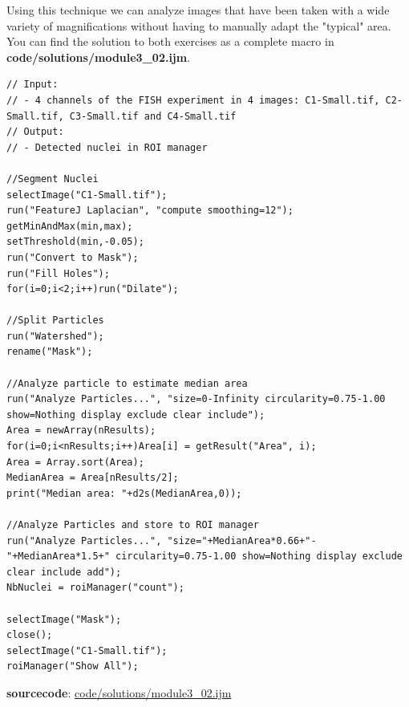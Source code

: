\documentclass[11pt,a4paper,oneside]{report}
\begin{document}
Using this technique we can analyze images that have been taken with a wide variety of magnifications without having to manually adapt the "typical" area. You can find the solution to both exercises as a complete macro in \textbf{code/solutions/module3\_02.ijm}.



\begin{lstlisting}[linerange={1-4}]
// Input: 
// - 4 channels of the FISH experiment in 4 images: C1-Small.tif, C2-Small.tif, C3-Small.tif and C4-Small.tif
// Output: 
// - Detected nuclei in ROI manager

//Segment Nuclei
selectImage("C1-Small.tif");
run("FeatureJ Laplacian", "compute smoothing=12");
getMinAndMax(min,max);
setThreshold(min,-0.05);
run("Convert to Mask");
run("Fill Holes");
for(i=0;i<2;i++)run("Dilate");

//Split Particles
run("Watershed");
rename("Mask");

//Analyze particle to estimate median area
run("Analyze Particles...", "size=0-Infinity circularity=0.75-1.00 show=Nothing display exclude clear include"); 
Area = newArray(nResults);
for(i=0;i<nResults;i++)Area[i] = getResult("Area", i);
Area = Array.sort(Area);
MedianArea = Area[nResults/2];
print("Median area: "+d2s(MedianArea,0));

//Analyze Particles and store to ROI manager
run("Analyze Particles...", "size="+MedianArea*0.66+"-"+MedianArea*1.5+" circularity=0.75-1.00 show=Nothing display exclude clear include add");
NbNuclei = roiManager("count");

selectImage("Mask");
close();
selectImage("C1-Small.tif");
roiManager("Show All");
\end{lstlisting}
\textbf{sourcecode}: \href{http://www.example.com/contents}{code/solutions/module3\_02.ijm}
\end{document}
